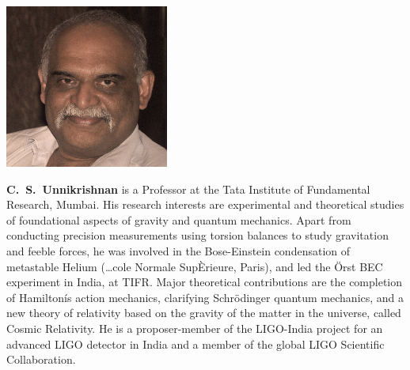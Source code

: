 \centerline{\includegraphics[scale=.7]{authorsphotos//C_S_Unnikrishnan.png}} 
\smallskip


\bigskip
\textbf{C.~S.~Unnikrishnan} is a Professor at the Tata Institute of Fundamental Research, Mumbai. His research interests are experimental and theoretical studies of foundational aspects of gravity and quantum mechanics. Apart from conducting precision measurements using torsion balances to study gravitation and feeble forces, he was involved in the Bose-Einstein condensation of metastable Helium (…cole Normale Sup\`Erieure, Paris), and led the \"{O}rst BEC experiment in India, at TIFR. Major theoretical contributions are the completion of Hamiltonís action mechanics, clarifying Schr\"{o}dinger quantum mechanics, and a new theory of relativity based on the gravity of the matter in the universe, called Cosmic Relativity. He is a proposer-member of the LIGO-India project for an advanced LIGO detector in India and a member of the global LIGO Scientific Collaboration.

